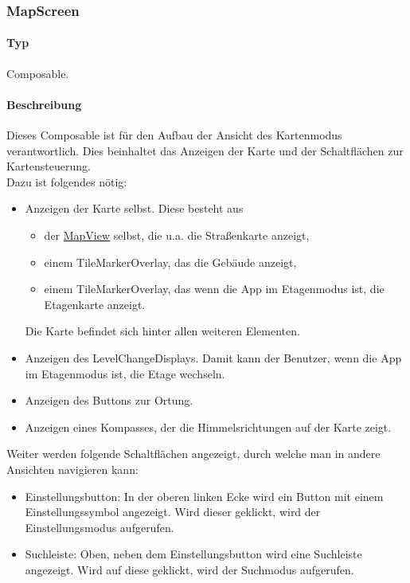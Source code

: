 \subsubsection{MapScreen}
\paragraph*{Typ}
Composable.
\paragraph*{Beschreibung}
Dieses Composable ist für den Aufbau der Ansicht des Kartenmodus verantwortlich.
Dies beinhaltet das Anzeigen der Karte und der Schaltflächen zur Kartensteuerung.\\
Dazu ist folgendes nötig:
\begin{itemize}
    \item Anzeigen der Karte selbst. Diese besteht aus
        \begin{itemize}
            \item der \href{https://osmdroid.github.io/osmdroid/javadocAll/org/osmdroid/views/MapView.html}
            {MapView} selbst, die u.a. die Straßenkarte anzeigt,
            \item einem TileMarkerOverlay, das die Gebäude anzeigt,
            \item einem TileMarkerOverlay, das wenn die App im Etagenmodus ist, die Etagenkarte anzeigt.
        \end{itemize}
        Die Karte befindet sich hinter allen weiteren Elementen.
    \item Anzeigen des LevelChangeDisplays. Damit kann der Benutzer, wenn die App im Etagenmodus 
    ist, die Etage wechseln.
    \item Anzeigen des Buttons zur Ortung.
    \item Anzeigen eines Kompasses, der die Himmelsrichtungen auf der Karte zeigt.
\end{itemize}
Weiter werden folgende Schaltflächen angezeigt, durch welche man in andere Ansichten navigieren kann:
\begin{itemize}
    \item Einstellungsbutton: In der oberen linken Ecke wird ein Button mit einem Einstellungssymbol angezeigt. 
    Wird dieser geklickt, wird der Einstellungsmodus aufgerufen.
    \item Suchleiste: Oben, neben dem Einstellungsbutton wird eine Suchleiste angezeigt. 
    Wird auf diese geklickt, wird der Suchmodus aufgerufen.
\end{itemize}

